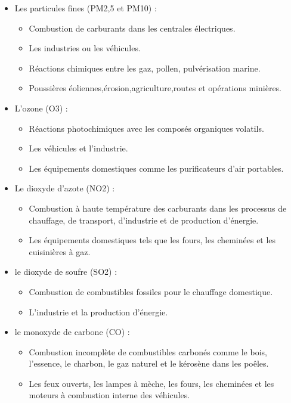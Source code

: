 \documentclass{report}
\begin{document}
\begin{itemize}
    \item Les particules fines (PM2,5 et PM10) :
    \begin{itemize}
        \item Combustion de carburants dans les centrales électriques.
        \item Les industries ou les véhicules.
        \item Réactions chimiques entre les gaz, pollen, pulvérisation marine.
        \item Poussières éoliennes,érosion,agriculture,routes et opérations minières.
    \end{itemize}
    \item L'ozone (O3) :
     \begin{itemize}
        \item Réactions photochimiques avec les composés organiques volatils.
        \item Les véhicules et l'industrie.
        \item Les équipements domestiques comme les purificateurs d'air portables.
    \end{itemize}
    \item Le dioxyde d'azote (NO2) :
     \begin{itemize}
        \item Combustion à haute température des carburants dans les processus de chauffage, de transport, d'industrie et de production d'énergie.
        \item Les équipements domestiques tels que les fours, les cheminées et les cuisinières à gaz. 
    \end{itemize}
    \item le dioxyde de soufre (SO2) :
     \begin{itemize}
        \item Combustion de combustibles fossiles pour le chauffage domestique.
        \item L'industrie et la production d'énergie.
    \end{itemize}
    \item le monoxyde de carbone (CO) :
     \begin{itemize}
        \item Combustion incomplète de combustibles carbonés comme le bois, l'essence, le charbon, le gaz naturel et le kérosène dans les poêles.
        \item  Les feux ouverts, les lampes à mèche, les fours, les cheminées et les moteurs à combustion interne des véhicules.
    \end{itemize}
\end{itemize}
\end{document}

